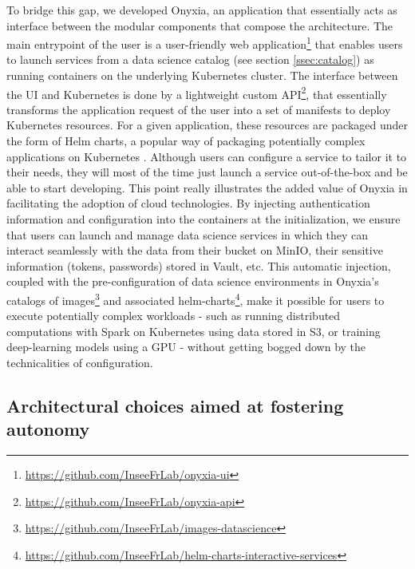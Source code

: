 
To bridge this gap, we developed Onyxia, an application that essentially acts as interface between the modular components that compose the architecture. The main entrypoint of the user is a user-friendly web application\footnote{\url{https://github.com/InseeFrLab/onyxia-ui}} that enables users to launch services from a data science catalog (see section \ref{ssec:catalog}) as running containers on the underlying Kubernetes cluster. The interface between the UI and Kubernetes is done by a lightweight custom API\footnote{\url{https://github.com/InseeFrLab/onyxia-api}}, that essentially transforms the application request of the user into a set of manifests to deploy Kubernetes resources. For a given application, these resources are packaged under the form of Helm charts, a popular way of packaging potentially complex applications on Kubernetes \cite{gokhale2021creating}. Although users can configure a service to tailor it to their needs, they will most of the time just launch a service out-of-the-box and be able to start developing. This point really illustrates the added value of Onyxia in facilitating the adoption of cloud technologies. By injecting authentication information and configuration into the containers at the initialization, we ensure that users can launch and manage data science services in which they can interact seamlessly with the data from their bucket on MinIO, their sensitive information (tokens, passwords) stored in Vault, etc. This automatic injection, coupled with the pre-configuration of data science environments in Onyxia's catalogs of images\footnote{\url{https://github.com/InseeFrLab/images-datascience}} and associated helm-charts\footnote{\url{https://github.com/InseeFrLab/helm-charts-interactive-services}}, make it possible for users to execute potentially complex workloads - such as running distributed computations with Spark on Kubernetes using data stored in S3, or training deep-learning models using a GPU - without getting bogged down by the technicalities of configuration.


\subsection{Architectural choices aimed at fostering autonomy}

